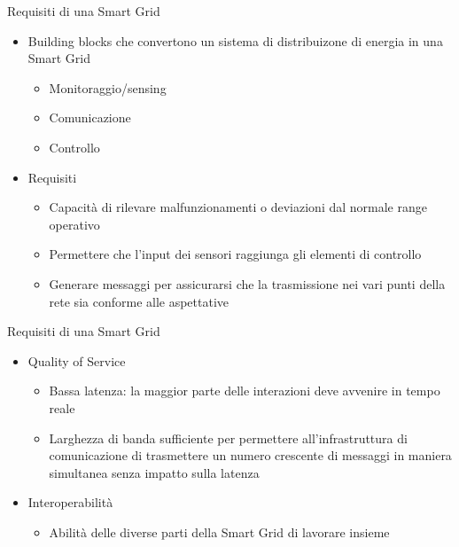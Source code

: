 \begin{frame}{Requisiti di una Smart Grid}
\begin{itemize}[<+- | alert@+>]
\item Building blocks che convertono un sistema di distribuizone di energia in una Smart Grid
\begin{itemize}
	\item Monitoraggio/sensing
	\item Comunicazione
	\item Controllo
\end{itemize}
\item Requisiti
\begin{itemize}
\item Capacità di rilevare malfunzionamenti o deviazioni dal normale range operativo
\item Permettere che l’input dei sensori raggiunga gli elementi di controllo
\item Generare messaggi per assicurarsi che la trasmissione nei vari punti della rete sia conforme alle aspettative
\end{itemize}
\end{itemize}
\end{frame}


\begin{frame}{Requisiti di una Smart Grid}
\begin{itemize}[<+- | alert@+>]
\item Quality of Service
	\begin{itemize}
		\item Bassa latenza: la maggior parte delle interazioni deve avvenire in tempo reale
		\item Larghezza di banda sufficiente per permettere all'infrastruttura di comunicazione di trasmettere un numero crescente di messaggi in maniera simultanea senza impatto sulla latenza
	\end{itemize}
\item Interoperabilità
	\begin{itemize}
		\item Abilità delle diverse parti della Smart Grid di lavorare insieme
	\end{itemize}
\end{itemize}
\end{frame}

